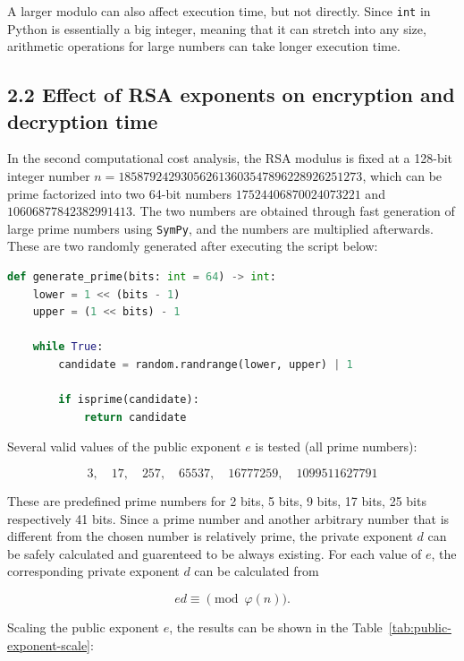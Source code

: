 \documentclass[11pt,a4paper]{article}
\begin{document}
A larger modulo can also affect execution time, but not directly. Since \texttt{int} in Python is essentially a big integer, meaning that it can stretch into any size, arithmetic operations for large numbers can take longer execution time.


\subsection*{2.2 Effect of RSA exponents on encryption and decryption time}

In the second computational cost analysis, the RSA modulus is fixed at a 128-bit integer number $n = 185879242930562613603547896228926251273$, which can be prime factorized into two 64-bit numbers $17524406870024073221$ and $10606877842382991413$. The two numbers are obtained through fast generation of large prime numbers using \texttt{SymPy}, and the numbers are multiplied afterwards. These are two randomly generated after executing the script below:

\begin{lstlisting}[language=python]
def generate_prime(bits: int = 64) -> int:
    lower = 1 << (bits - 1)
    upper = (1 << bits) - 1

    while True:
        candidate = random.randrange(lower, upper) | 1

        if isprime(candidate):
            return candidate
\end{lstlisting}

Several valid values of the public exponent $e$ is tested (all prime numbers):

$$ 3,\quad17,\quad257,\quad65537,\quad16777259, \quad1099511627791 $$

These are predefined prime numbers for 2 bits, 5 bits, 9 bits, 17 bits, 25 bits respectively 41 bits. Since a prime number and another arbitrary number that is different from the chosen number is relatively prime, the private exponent $d$ can be safely calculated and guarenteed to be always existing. For each value of $e$, the corresponding private exponent $d$ can be calculated from

$$
ed \equiv \pmod{\varphi(n)}.
$$

Scaling the public exponent $e$, the results can be shown in the Table~\ref{tab:public-exponent-scale}:
\end{document}
